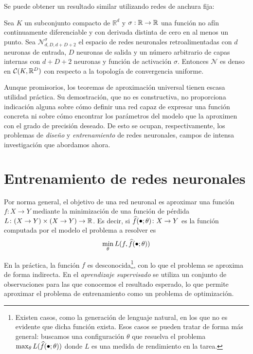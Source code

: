 Se puede obtener un resultado similar utilizando redes de anchura fija:
\begin{theorem}
Sea \( K \) un subconjunto compacto de \( \mathbb{R}^d \) y \( \sigma: \mathbb{R} \to \mathbb{R} \) una función no afín continuamente diferenciable y con derivada distinta de cero en al menos un punto. Sea \( \mathcal{N}^\sigma_{d, D, d + D + 2} \) el espacio de redes neuronales retroalimentadas con \( d \) neuronas de entrada, \( D \) neuronas de salida y un número arbitrario de capas internas con \( d + D + 2\) neuronas y función de activación \( \sigma \). Entonces \( \mathcal{N} \) es denso en \( \mathcal{C} (K, \mathbb{R}^{D}) \) con respecto a la topología de convergencia uniforme.
\end{theorem}

Aunque promisorios, los teoremas de aproximación universal tienen escasa utilidad práctica. Su demostración, que no es constructiva, no proporciona indicación alguna sobre cómo definir una red capaz de expresar una función concreta ni sobre cómo encontrar los parámetros del modelo que la aproximen con el grado de precisión deseado. De esto se ocupan, respectivamente, los problemas de \textit{diseño} y \textit{entrenamiento} de redes neuronales, campos de intensa investigación que abordamos ahora.

\section{Entrenamiento de redes neuronales}
Por norma general, el objetivo de una red neuronal es aproximar una función \( f \colon X \to Y  \) mediante la minimización de una función de pérdida \( L \colon (X \to Y) \times (X \to Y) \to \mathbb{R} \). Es decir, si \( \widehat{f}(\smallbullet; \theta) \colon X \to Y \) es la función computada por el modelo el problema a resolver es
\begin{equation}
    \min_\theta L(f, \widehat{f}(\smallbullet; \theta))
\end{equation}

En la práctica, la función \( f \) es desconocida\footnote{Existen casos, como la generación de lenguaje natural, en los que no es evidente que dicha función exista. Esos casos se pueden tratar de forma más general: buscamos una configuración \( \theta \) que resuelva el problema \( \max_\theta L(\widehat{f}(\smallbullet; \theta))\) donde \( L \) es una medida de rendimiento en la tarea.}, con lo que el problema se aproxima de forma indirecta. En el \textit{aprendizaje supervisado} se utiliza un conjunto de observaciones para las que conocemos el resultado esperado, lo que permite aproximar el problema de entrenamiento como un problema de optimización.

